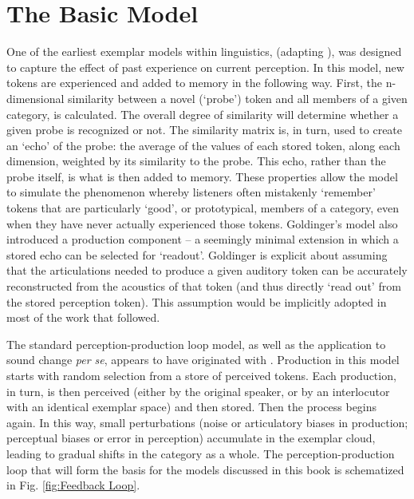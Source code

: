 \chapter{\label{sec:The-Exemplar-Model}The Basic Model}

One of the earliest exemplar models within linguistics, \citet{Goldinger1996}
(adapting \citet{hintzman1984minerva}), was designed to capture the
effect of past experience on current perception. In this model, new
tokens are experienced and added to memory in the following way. First,
the n-dimensional similarity between a novel (`probe') token and all
members of a given category, is calculated. The overall degree of
similarity will determine whether a given probe is recognized or not.
The similarity matrix is, in turn, used to create an `echo' of the
probe: the average of the values of each stored token, along each
dimension, weighted by its similarity to the probe. This echo, rather
than the probe itself, is what is then added to memory. These properties
allow the model to simulate the phenomenon whereby listeners often
mistakenly `remember' tokens that are particularly `good', or prototypical,
members of a category, even when they have never actually experienced
those tokens. Goldinger's model also introduced a production component
– a seemingly minimal extension in which a stored echo can be selected
for `readout'. Goldinger is explicit about assuming that the articulations
needed to produce a given auditory token can be accurately reconstructed
from the acoustics of that token (and thus directly `read out' from
the stored perception token). This assumption would be implicitly
adopted in most of the work that followed. 

The standard perception-production loop model, as well as the application
to sound change \emph{per se}, appears to have originated with \citet{Pierrehumbert2000}.
Production in this model starts with random selection from a store
of perceived tokens. Each production, in turn, is then perceived (either
by the original speaker, or by an interlocutor with an identical exemplar
space) and then stored. Then the process begins again. In this way,
small perturbations (noise or articulatory biases in production; perceptual
biases or error in perception) accumulate in the exemplar cloud, leading
to gradual shifts in the category as a whole. The perception-production
loop that will form the basis for the models discussed in this book
is schematized in Fig. \ref{fig:Feedback Loop}.

